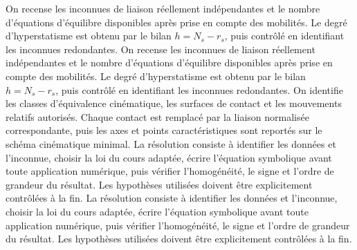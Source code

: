 \begin{corrigebox}[Corrigé]
On recense les inconnues de liaison réellement indépendantes et le nombre d'équations d'équilibre disponibles après prise en compte des mobilités. Le degré d'hyperstatisme est obtenu par le bilan $h=N_s-r_s$, puis contrôlé en identifiant les inconnues redondantes.
On recense les inconnues de liaison réellement indépendantes et le nombre d'équations d'équilibre disponibles après prise en compte des mobilités. Le degré d'hyperstatisme est obtenu par le bilan $h=N_s-r_s$, puis contrôlé en identifiant les inconnues redondantes.
On identifie les classes d'équivalence cinématique, les surfaces de contact et les mouvements relatifs autorisés. Chaque contact est remplacé par la liaison normalisée correspondante, puis les axes et points caractéristiques sont reportés sur le schéma cinématique minimal.
La résolution consiste à identifier les données et l'inconnue, choisir la loi du cours adaptée, écrire l'équation symbolique avant toute application numérique, puis vérifier l'homogénéité, le signe et l'ordre de grandeur du résultat. Les hypothèses utilisées doivent être explicitement contrôlées à la fin.
La résolution consiste à identifier les données et l'inconnue, choisir la loi du cours adaptée, écrire l'équation symbolique avant toute application numérique, puis vérifier l'homogénéité, le signe et l'ordre de grandeur du résultat. Les hypothèses utilisées doivent être explicitement contrôlées à la fin.
\end{corrigebox}
